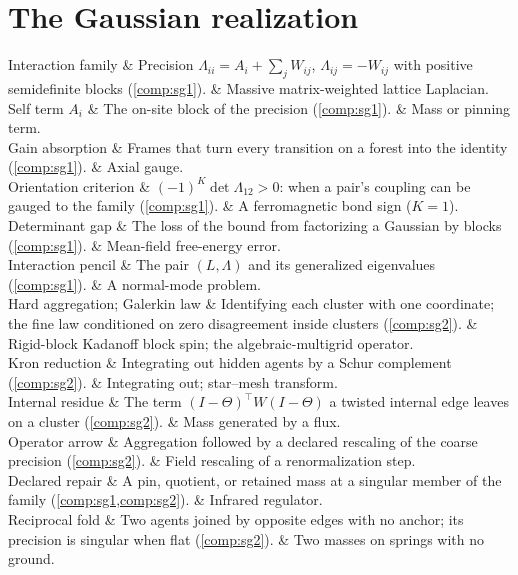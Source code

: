 \section*{The Gaussian realization}

\begin{decoder}
Interaction family & Precision $\Lambda_{ii}=A_i+\sum_jW_{ij}$, $\Lambda_{ij}=-W_{ij}$ with positive semidefinite blocks (\cref{comp:sg1}). & Massive matrix-weighted lattice Laplacian. \\
Self term $A_i$ & The on-site block of the precision (\cref{comp:sg1}). & Mass or pinning term. \\
Gain absorption & Frames that turn every transition on a forest into the identity (\cref{comp:sg1}). & Axial gauge. \\
Orientation criterion & $(-1)^K\det\Lambda_{12}>0$: when a pair's coupling can be gauged to the family (\cref{comp:sg1}). & A ferromagnetic bond sign ($K=1$). \\
Determinant gap & The loss of the bound from factorizing a Gaussian by blocks (\cref{comp:sg1}). & Mean-field free-energy error. \\
Interaction pencil & The pair $(L,\Lambda)$ and its generalized eigenvalues (\cref{comp:sg1}). & A normal-mode problem. \\
Hard aggregation; Galerkin law & Identifying each cluster with one coordinate; the fine law conditioned on zero disagreement inside clusters (\cref{comp:sg2}). & Rigid-block Kadanoff block spin; the algebraic-multigrid operator. \\
Kron reduction & Integrating out hidden agents by a Schur complement (\cref{comp:sg2}). & Integrating out; star--mesh transform. \\
Internal residue & The term $(I-\Theta)^\top W(I-\Theta)$ a twisted internal edge leaves on a cluster (\cref{comp:sg2}). & Mass generated by a flux. \\
Operator arrow & Aggregation followed by a declared rescaling of the coarse precision (\cref{comp:sg2}). & Field rescaling of a renormalization step. \\
Declared repair & A pin, quotient, or retained mass at a singular member of the family (\cref{comp:sg1,comp:sg2}). & Infrared regulator. \\
Reciprocal fold & Two agents joined by opposite edges with no anchor; its precision is singular when flat (\cref{comp:sg2}). & Two masses on springs with no ground. \\
\end{decoder}

